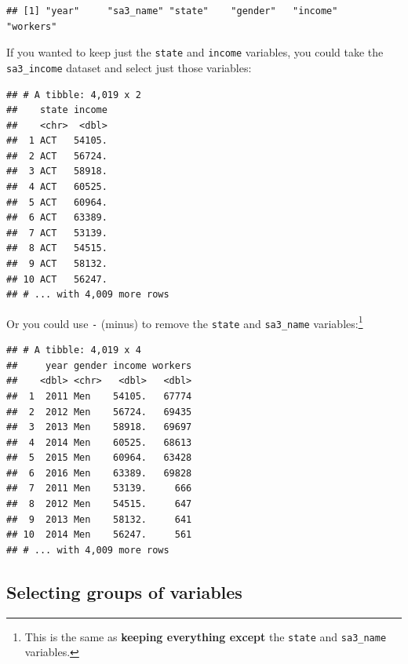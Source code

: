 \documentclass[]{book}
\newenvironment{Shaded}{\begin{snugshade}}{\end{snugshade}}
\newcommand{\KeywordTok}[1]{\textcolor[rgb]{0.13,0.29,0.53}{\textbf{#1}}}
\newcommand{\NormalTok}[1]{#1}
\newcommand{\OperatorTok}[1]{\textcolor[rgb]{0.81,0.36,0.00}{\textbf{#1}}}
\newcommand{\StringTok}[1]{\textcolor[rgb]{0.31,0.60,0.02}{#1}}
\begin{document}
\begin{verbatim}
## [1] "year"     "sa3_name" "state"    "gender"   "income"   "workers"
\end{verbatim}

If you wanted to keep just the \texttt{state} and \texttt{income} variables, you could take the \texttt{sa3\_income} dataset and select just those variables:

\begin{Shaded}
\end{Shaded}

\begin{verbatim}
## # A tibble: 4,019 x 2
##    state income
##    <chr>  <dbl>
##  1 ACT   54105.
##  2 ACT   56724.
##  3 ACT   58918.
##  4 ACT   60525.
##  5 ACT   60964.
##  6 ACT   63389.
##  7 ACT   53139.
##  8 ACT   54515.
##  9 ACT   58132.
## 10 ACT   56247.
## # ... with 4,009 more rows
\end{verbatim}

Or you could use \texttt{-} (minus) to remove the \texttt{state} and \texttt{sa3\_name} variables:\footnote{This is the same as \textbf{keeping everything except} the \texttt{state} and \texttt{sa3\_name} variables.}

\begin{Shaded}
\end{Shaded}

\begin{verbatim}
## # A tibble: 4,019 x 4
##     year gender income workers
##    <dbl> <chr>   <dbl>   <dbl>
##  1  2011 Men    54105.   67774
##  2  2012 Men    56724.   69435
##  3  2013 Men    58918.   69697
##  4  2014 Men    60525.   68613
##  5  2015 Men    60964.   63428
##  6  2016 Men    63389.   69828
##  7  2011 Men    53139.     666
##  8  2012 Men    54515.     647
##  9  2013 Men    58132.     641
## 10  2014 Men    56247.     561
## # ... with 4,009 more rows
\end{verbatim}

\hypertarget{selecting-groups-of-variables}{%
\subsection{Selecting groups of variables}\label{selecting-groups-of-variables}}
\end{document}
